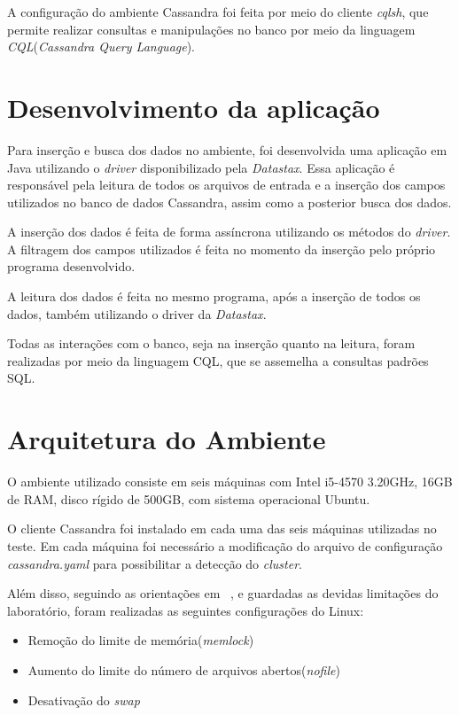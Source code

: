A configuração do ambiente Cassandra foi feita por meio do cliente \emph{cqlsh}, que permite realizar consultas e manipulações no banco por meio da linguagem \emph{CQL}(\emph{Cassandra Query Language}).

\section{Desenvolvimento da aplicação}
Para inserção e busca dos dados no ambiente, foi desenvolvida uma aplicação em Java utilizando o \emph{driver} disponibilizado pela \emph{Datastax}. Essa aplicação é responsável pela leitura de todos os arquivos de entrada e a inserção dos campos utilizados no banco de dados Cassandra, assim como a posterior busca dos dados.

A inserção dos dados é feita de forma assíncrona utilizando os métodos do \emph{driver}. A filtragem dos campos utilizados é feita no momento da inserção pelo próprio programa desenvolvido.

A leitura dos dados é feita no mesmo programa, após a inserção de todos os dados, também utilizando o driver da \emph{Datastax}.

Todas as interações com o banco, seja na inserção quanto na leitura, foram realizadas por meio da linguagem CQL, que se assemelha a consultas padrões SQL.

\section{Arquitetura do Ambiente}
O ambiente utilizado consiste em seis máquinas com Intel i5-4570 3.20GHz, 16GB de RAM, disco rígido de 500GB, com sistema operacional Ubuntu.

O cliente Cassandra foi instalado em cada uma das seis máquinas utilizadas no teste. Em cada máquina foi necessário a modificação do arquivo de configuração \emph{cassandra.yaml} para possibilitar a detecção do \emph{cluster}.

Além disso, seguindo as orientações em ~\cite{cassandrasettings}, e guardadas as devidas limitações do laboratório, foram realizadas as seguintes configurações do Linux:
\begin{itemize}
	\item Remoção do limite de memória(\emph{memlock})
	\item Aumento do limite do número de arquivos abertos(\emph{nofile})
	\item Desativação do \emph{swap}
\end{itemize}




